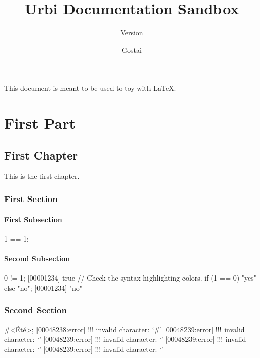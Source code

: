 \documentclass[openright,twoside,11pt]{book}
\title{Urbi Documentation Sandbox}
\subtitle{Version \VcsDescription}
\author{Gostai}
\begin{document}
\let\deepChapter\chapter
\NewSection\deepChapter{\thechapter}

\maketitle

This document is meant to be used to toy with \LaTeX{}.

\tableofcontents
\part{First Part}
\chapter{First Chapter}

This is the first chapter.

\section{First Section}

\subsection{First Subsection}
\begin{urbiassert}[firstnumber=1]
1 == 1;
\end{urbiassert}

\subsection{Second Subsection}
\begin{urbiscript}
0 != 1;
[00001234] true
// Check the syntax highlighting colors.
if (1 == 0) "yes" else "no";
[00001234] "no"
\end{urbiscript}

\section{Second Section}
\begin{urbiunchecked}[escapeinside=<>]
#<Été>;
[00048238:error] !!! invalid character: `#'
[00048239:error] !!! invalid character: `'
[00048239:error] !!! invalid character: `'
[00048239:error] !!! invalid character: `'
[00048239:error] !!! invalid character: `'
\end{urbiunchecked}
\end{document}
